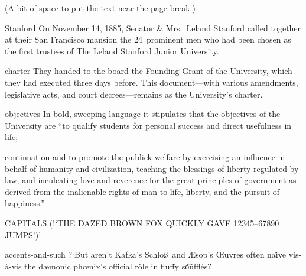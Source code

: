 \documentclass[twoside]{ltxdoc}
\begin{document}
\vspace*{0.5\textheight}

(A bit of space to put the text near the page break.)

\begingroup
{}
\setlength{}

\begin{environment}{Stanford}
  On November 14, 1885, Senator \& Mrs.~Leland Stanford called
  together at their San Francisco mansion the 24~prominent men who
  had been chosen as the first trustees of The Leland Stanford
  Junior University. 
\end{environment}

\begin{environment}{charter}      
  They handed to the board the Founding Grant
  of the University, which they had executed three days before.
  This document---with various amendments, legislative acts, and
  court decrees---remains as the University's charter.  
\end{environment}

\begin{environment}{objectives}
  In bold, sweeping language it stipulates that the objectives of the
  University are ``to qualify students for personal success and
  direct usefulness in life; 
\end{environment}

\begin{environment}{continuation}
  and to promote the publick welfare by
  exercising an influence in behalf of humanity and civilization,
  teaching the blessings of liberty regulated by law, and
  inculcating love and reverence for the great principles of
  government as derived from the inalienable rights of man to life,
  liberty, and the pursuit of happiness.''
\end{environment}

\begin{environment}{CAPITALS}
  (!`THE DAZED BROWN FOX QUICKLY GAVE 12345--67890 JUMPS!)'
\end{environment}

\begin{environment}{accents-and-such}
  ?`But aren't Kafka's Schlo\ss\
  and \AE sop's \OE uvres often na\"\i ve vis-\`a-vis the
  d\ae monic ph\oe nix's official r\^ole in fluffy s\t ouffl\'es?
\end{environment}
\end{document}
